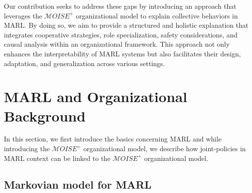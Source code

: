 \documentclass[sn-mathphys-num]{sn-jnl}%
\theoremstyle{thmstyleone}%
\theoremstyle{thmstyletwo}%
\theoremstyle{thmstylethree}%
\begin{document}
Our contribution seeks to address these gaps by introducing an approach that leverages the $\mathcal{M}OISE^+$ organizational model to explain collective behaviors in MARL. By doing so, we aim to provide a structured and holistic explanation that integrates cooperative strategies, role specialization, safety considerations, and causal analysis within an organizational framework. This approach not only enhances the interpretability of MARL systems but also facilitates their design, adaptation, and generalization across various settings.


\section{MARL and Organizational Background}\label{sec:background}




In this section, we first introduce the basics concerning MARL and while introducing the $\mathcal{M}OISE^{+}$ organizational model, we describe how joint-policies in MARL context can be linked to the $\mathcal{M}OISE^{+}$ organizational model.

\subsection{Markovian model for MARL}
\end{document}
